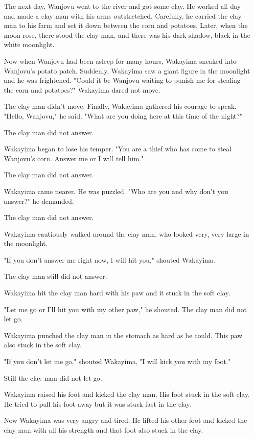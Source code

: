 The next day, Wanjovu went to the river and got some clay. He worked all day and made a clay man with his arms outstretched. Carefully, he carried the clay man to his farm and set it down between the corn and potatoes. Later, when the moon rose, there stood the clay man, and there was his dark shadow, black in the white moonlight.

Now when Wanjovu had been asleep for many hours, Wakayima sneaked into Wanjovu's potato patch. Suddenly, Wakayima saw a giant figure in the moonlight and he was frightened. "Could it be Wanjovu waiting to punish me for stealing the corn and potatoes?" Wakayima dared not move.

The clay man didn't move. Finally, Wakayima gathered his courage to speak. "Hello, Wanjovu," he said. "What are you doing here at this time of the night?"

The clay man did not answer.

Wakayima began to lose his temper. "You are a thief who has come to steal Wanjovu's corn. Answer me or I will tell him."

The clay man did not answer.

Wakayima came nearer. He was puzzled. "Who are you and why don't you answer?" he demanded.

The clay man did not answer.

Wakayima cautiously walked around the clay man, who looked very, very large in the moonlight.

"If you don't answer me right now, I will hit you," shouted Wakayima.

The clay man still did not answer.

Wakayima hit the clay man hard with his paw and it stuck in the soft clay.

"Let me go or I'll hit you with my other paw," he shouted. The clay man did not let go.

Wakayima punched the clay man in the stomach as hard as he could. This paw also stuck in the soft clay.

"If you don't let me go," shouted Wakayima, "I will kick you with my foot."

Still the clay man did not let go.

Wakayima raised his foot and kicked the clay man. His foot stuck in the soft clay. He tried to pull his foot away but it was stuck fast in the clay.

Now Wakayima was very angry and tired. He lifted his other foot and kicked the clay man with all his strength and that foot also stuck in the clay.

